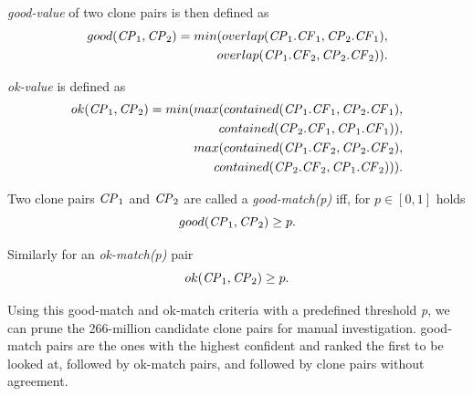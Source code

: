 \documentclass{sig-alternate-05-2015}
\newcommand{\squeezeup}{\vspace{-0.5mm}}
\begin{document}
\noindent\textit{good-value} of two clone pairs is then defined as
\begin{align*}
	good(\textrm{\textit{CP}}_1, \textrm{\textit{CP}}_2) = min(overlap(\textrm{\textit{CP}}_1.\textrm{\textit{CF}}_1,\textrm{\textit{CP}}_2.\textrm{\textit{CF}}_1), \\ overlap(\textrm{\textit{CP}}_1.\textrm{\textit{CF}}_2,\textrm{\textit{CP}}_2.\textrm{\textit{CF}}_2)).
\end{align*}

\noindent\textit{ok-value} is defined as
\begin{align*}
	ok(\textrm{\textit{CP}}_1,\textrm{\textit{CP}}_2) = min(max(contained(\textrm{\textit{CP}}_1.\textrm{\textit{CF}}_1,\textrm{\textit{CP}}_2.\textrm{\textit{CF}}_1), \\ contained(\textrm{\textit{CP}}_2.\textrm{\textit{CF}}_1,\textrm{\textit{CP}}_1.\textrm{\textit{CF}}_1)),
	\\ max(contained(\textrm{\textit{CP}}_1.\textrm{\textit{CF}}_2,\textrm{\textit{CP}}_2.\textrm{\textit{CF}}_2), \\contained(\textrm{\textit{CP}}_2.\textrm{\textit{CF}}_2,\textrm{\textit{CP}}_1.\textrm{\textit{CF}}_2))).
\end{align*}

Two clone pairs $\textrm{\textit{CP}}_1$ and $\textrm{\textit{CP}}_2$ are called a \textit{good-match(p)} iff, for $p \in [0,1]$ holds 
\begin{equation}
good(\textrm{\textit{CP}}_1,\textrm{\textit{CP}}_2) \geq p.
\end{equation}

Similarly for an \textit{ok-match(p)} pair
\begin{equation}
ok(\textrm{\textit{CP}}_1,\textrm{\textit{CP}}_2) \geq p.
\end{equation}

Using this good-match and ok-match criteria with a predefined threshold \textit{p}, we can prune the 266-million candidate clone pairs for manual investigation. good-match pairs are the ones with the highest confident and ranked the first to be looked at, followed by ok-match pairs, and followed by clone pairs without agreement.
\end{document}
